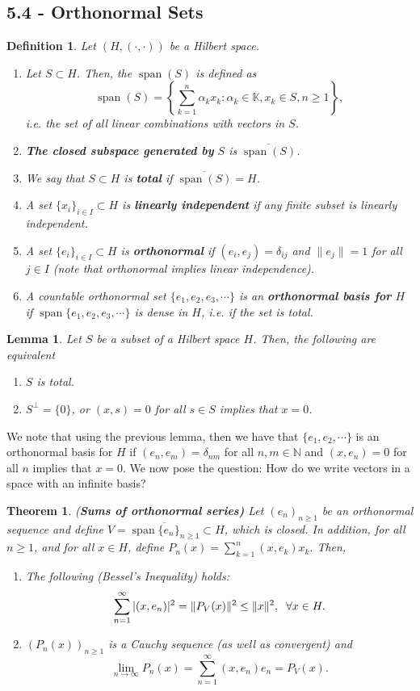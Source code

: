 \documentclass[12pt]{article}
\newtheorem{theorem}{Theorem}
\newtheorem{lemma}{Lemma}
\newtheorem{definition}{Definition}
\def\K{\mathbb{K}}
\newcommand{\N}{{\mathbb N}}
\newcommand{\sumi}{\sum\limits_{n = 1}^{\infty}}
\newcommand{\sumkn}{\sum\limits_{k = 1}^{n}}
\newcommand{\ov}{\overline}
\newcommand{\sbs}{\subset}
\newcommand{\limi}{\lim\limits_{n \to \infty}}
\DeclareMathOperator*{\spa}{span}
\newcommand{\inner}{(\cdot, \cdot)}
\begin{document}
\subsection*{5.4 - Orthonormal Sets}
\begin{definition}
Let $(H, \inner)$ be a Hilbert space.
\begin{enumerate}[itemsep=0pt, topsep=-15pt]
\item[(1)] Let $S \sbs H$. Then, the $\spa(S)$ is defined as
\[ \spa(S) = \left\lbrace \sum\limits_{k = 1}^n \alpha_k x_k : \alpha_k \in \K, x_k \in S, n \geq 1 \right\rbrace,\]
i.e. the set of all linear combinations with vectors in $S$. 
\item \textbf{The closed subspace generated by} $S$ is $\ov{\spa(S)}$.
\item We say that $S \sbs H$ is \textbf{total} if $\ov{\spa(S)} = H$.
\item A set $\{ x_i \}_{i \in I} \sbs H$ is \textbf{linearly independent} if any finite subset is linearly independent.
\item A set $\{ e_i \}_{i \in I} \sbs H$ is \textbf{orthonormal} if $(e_i, e_j) = \delta_{ij}$ and $\| e_j \| = 1$ for all $j \in I$ (note that orthonormal implies linear independence).
\item A countable orthonormal set $\{e_1, e_2, e_3, \cdots \}$ is an \textbf{orthonormal basis for} $H$ if $\spa\{ e_1, e_2, e_3, \cdots \}$ is dense in $H$, i.e. if the set is total. 
\end{enumerate}
\end{definition}
\begin{lemma}
Let $S$ be a subset of a Hilbert space $H$. Then, the following are equivalent
\begin{enumerate}[itemsep=0pt, topsep=-15pt]
\item $S$ is total.
\item $S^{\perp} = \{ 0 \}$, or $(x, s) = 0$ for all $s \in S$ implies that $x = 0$. 
\end{enumerate}
\end{lemma}
\vspace{-15pt}
We note that using the previous lemma, then we have that $\{ e_1, e_2, \cdots \}$ is an orthonormal basis for $H$ if $(e_n, e_m) = \delta_{nm}$ for all $n, m \in \N$ and $(x, e_n) = 0$ for all $n$ implies that $x = 0$. We now pose the question: How do we write vectors in a space with an infinite basis?
\begin{theorem} (\textbf{Sums of orthonormal series)} Let $(e_n)_{n \geq 1}$ be an orthonormal sequence and define $V = \ov{\spa\{ e_n \}_{n \geq 1}} \sbs H$, which is closed. In addition, for all $n \geq 1$, and for all $x \in H$, define $P_n(x) = \sumkn (x, e_k) x_k.$ Then, 
\begin{enumerate}[itemsep=-15pt, topsep=0pt]
\item The following (Bessel's Inequality) holds:
\[ \sumi |(x, e_n)|^2 = \| P_V(x) \|^2 \leq \| x \|^2, \hspace{2mm} \forall x \in H.\]
\item $(P_n(x))_{n \geq 1}$ is a Cauchy sequence (as well as convergent) and 
\[ \limi P_n(x) = \sumi (x, e_n) e_n = P_V(x).\]
\end{enumerate}
\end{theorem}
\end{document}
